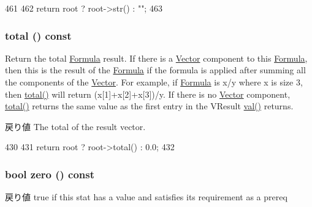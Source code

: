 \begin{DoxyCode}
461 {
462     return root ? root->str() : "";
463 }
\end{DoxyCode}
\hypertarget{classStats_1_1Formula_a35c6e2ed3fc81b40d69052a062113ead}{
\subsubsection[{total}]{ total () const}}
\label{classStats_1_1Formula_a35c6e2ed3fc81b40d69052a062113ead}
Return the total \hyperlink{classStats_1_1Formula}{Formula} result. If there is a \hyperlink{classStats_1_1Vector}{Vector} component to this \hyperlink{classStats_1_1Formula}{Formula}, then this is the result of the \hyperlink{classStats_1_1Formula}{Formula} if the formula is applied after summing all the components of the \hyperlink{classStats_1_1Vector}{Vector}. For example, if \hyperlink{classStats_1_1Formula}{Formula} is x/y where x is size 3, then \hyperlink{classStats_1_1Formula_a35c6e2ed3fc81b40d69052a062113ead}{total()} will return (x\mbox{[}1\mbox{]}+x\mbox{[}2\mbox{]}+x\mbox{[}3\mbox{]})/y. If there is no \hyperlink{classStats_1_1Vector}{Vector} component, \hyperlink{classStats_1_1Formula_a35c6e2ed3fc81b40d69052a062113ead}{total()} returns the same value as the first entry in the VResult \hyperlink{namespaceX86ISA_ae13bf1250853ff6b72aabe3c79b587cc}{val()} returns. \begin{DoxyReturn}{戻り値}
The total of the result vector. 
\end{DoxyReturn}



\begin{DoxyCode}
430 {
431     return root ? root->total() : 0.0;
432 }
\end{DoxyCode}
\hypertarget{classStats_1_1Formula_a4e72b01b727d3165e75cba84eb507491}{
\subsubsection[{zero}]{\setlength{\rightskip}{0pt plus 5cm}bool zero () const}}
\label{classStats_1_1Formula_a4e72b01b727d3165e75cba84eb507491}
\begin{DoxyReturn}{戻り値}
true if this stat has a value and satisfies its requirement as a prereq 
\end{DoxyReturn}


